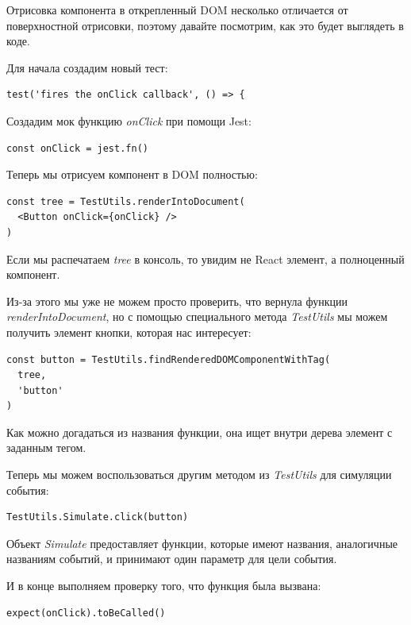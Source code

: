Отрисовка компонента в открепленный DOM несколько отличается от поверхностной отрисовки, поэтому давайте посмотрим, как это будет выглядеть в коде.

Для начала создадим новый тест:

\begin{lstlisting}
test('fires the onClick callback', () => {
\end{lstlisting} 

Создадим мок функцию \textit{onClick} при помощи Jest:

\begin{lstlisting}
const onClick = jest.fn()
\end{lstlisting}

Теперь мы отрисуем компонент в DOM полностью:

\begin{lstlisting}
const tree = TestUtils.renderIntoDocument(
  <Button onClick={onClick} />
)
\end{lstlisting}

Если мы распечатаем \textit{tree} в консоль, то увидим не React элемент, а полноценный компонент.

Из-за этого мы уже не можем просто проверить, что вернула функции \textit{renderIntoDocument}, но с помощью специального метода \textit{TestUtils} мы можем получить элемент кнопки, которая нас интересует:

\begin{lstlisting}
const button = TestUtils.findRenderedDOMComponentWithTag(
  tree,
  'button'
)
\end{lstlisting}

Как можно догадаться из названия функции, она ищет внутри дерева элемент с заданным тегом.

Теперь мы можем воспользоваться другим методом из \textit{TestUtils} для симуляции события:

\begin{lstlisting}
TestUtils.Simulate.click(button)
\end{lstlisting}

Объект \textit{Simulate} предоставляет функции, которые имеют названия, аналогичные названиям событий, и принимают один параметр для цели события.

И в конце выполняем проверку того, что функция была вызвана:

\begin{lstlisting}
expect(onClick).toBeCalled()
\end{lstlisting}

